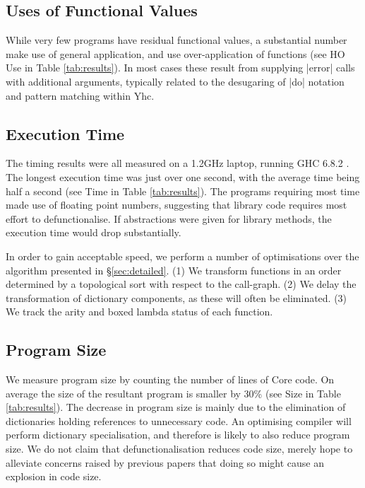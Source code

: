 \documentclass[preprint]{sigplanconf}
\begin{document}
\subsection{Uses of Functional Values}

While very few programs have residual functional values, a substantial number make use of general application, and use over-application of functions (see HO Use in Table \ref{tab:results}). In most cases these result from supplying |error| calls with additional arguments, typically related to the desugaring of |do| notation and pattern matching within Yhc.

\subsection{Execution Time}
\label{sec:time}

The timing results were all measured on a 1.2GHz laptop, running GHC 6.8.2 \cite{ghc}. The longest execution time was just over one second, with the average time being half a second (see Time in Table \ref{tab:results}). The programs requiring most time made use of floating point numbers, suggesting that library code requires most effort to defunctionalise. If abstractions were given for library methods, the execution time would drop substantially.

In order to gain acceptable speed, we perform a number of optimisations over the algorithm presented in \S\ref{sec:detailed}. (1) We transform functions in an order determined by a topological sort with respect to the call-graph. (2) We delay the transformation of dictionary components, as these will often be eliminated. (3) We track the arity and boxed lambda status of each function.

\subsection{Program Size}

We measure program size by counting the number of lines of Core code. On average the size of the resultant program is smaller by 30\% (see Size in Table \ref{tab:results}). The decrease in program size is mainly due to the elimination of dictionaries holding references to unnecessary code. An optimising compiler will perform dictionary specialisation, and therefore is likely to also reduce program size. We do not claim that defunctionalisation reduces code size, merely hope to alleviate concerns raised by previous papers \cite{chin:higher_order_removal} that doing so might cause an explosion in code size.
\end{document}

